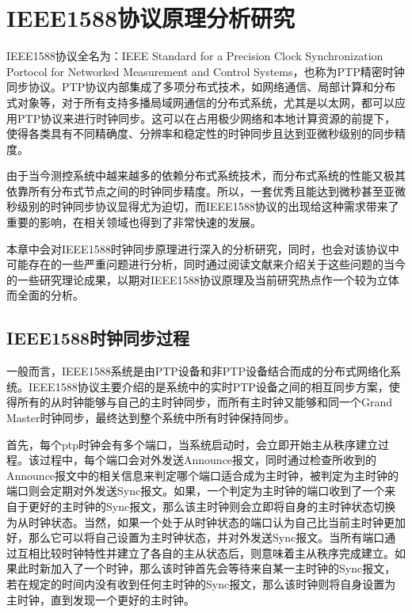 
\chapter{IEEE1588协议原理分析研究}
\label{chap:1588_theory}
IEEE1588协议全名为：IEEE Standard for a Precision Clock Synchronization Portocol for Networked Measurement and Control Systems，也称为PTP精密时钟同步协议。PTP协议内部集成了多项分布式技术，如网络通信、局部计算和分布式对象等，对于所有支持多播局域网通信的分布式系统，尤其是以太网，都可以应用PTP协议来进行时钟同步。这可以在占用极少网络和本地计算资源的前提下，使得各类具有不同精确度、分辨率和稳定性的时钟同步且达到亚微秒级别的同步精度。

由于当今测控系统中越来越多的依赖分布式系统技术，而分布式系统的性能又极其依靠所有分布式节点之间的时钟同步精度。所以，一套优秀且能达到微秒甚至亚微秒级别的时钟同步协议显得尤为迫切，而IEEE1588协议的出现给这种需求带来了重要的影响，在相关领域也得到了非常快速的发展。

本章中会对IEEE1588时钟同步原理进行深入的分析研究，同时，也会对该协议中可能存在的一些严重问题进行分析，同时通过阅读文献来介绍关于这些问题的当今的一些研究理论成果，以期对IEEE1588协议原理及当前研究热点作一个较为立体而全面的分析。

\section{IEEE1588时钟同步过程}
一般而言，IEEE1588系统是由PTP设备和非PTP设备结合而成的分布式网络化系统。IEEE1588协议主要介绍的是系统中的实时PTP设备之间的相互同步方案，使得所有的从时钟能够与自己的主时钟同步，而所有主时钟又能够和同一个Grand Master时钟同步，最终达到整个系统中所有时钟保持同步。

首先，每个ptp时钟会有多个端口，当系统启动时，会立即开始主从秩序建立过程。该过程中，每个端口会对外发送Announce报文，同时通过检查所收到的Announce报文中的相关信息来判定哪个端口适合成为主时钟，被判定为主时钟的端口则会定期对外发送Sync报文。如果，一个判定为主时钟的端口收到了一个来自于更好的主时钟的Sync报文，那么该主时钟则会立即将自身的主时钟状态切换为从时钟状态。当然，如果一个处于从时钟状态的端口认为自己比当前主时钟更加好，那么它可以将自己设置为主时钟状态，并对外发送Sync报文。当所有端口通过互相比较时钟特性并建立了各自的主从状态后，则意味着主从秩序完成建立。如果此时新加入了一个时钟，那么该时钟首先会等待来自某一主时钟的Sync报文，若在规定的时间内没有收到任何主时钟的Sync报文，那么该时钟则将自身设置为主时钟，直到发现一个更好的主时钟。

